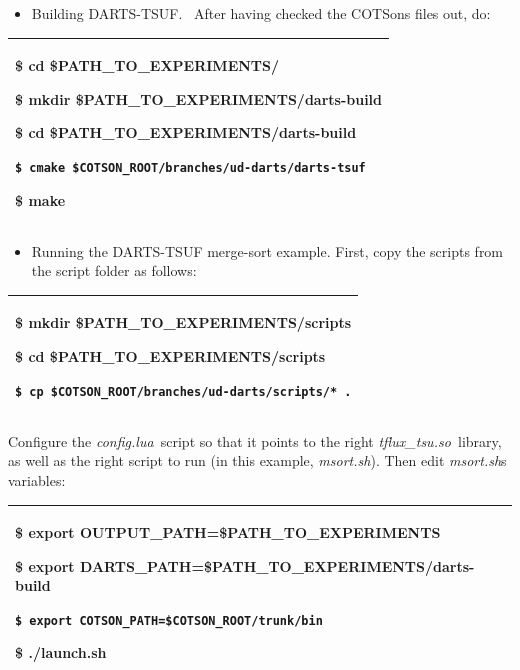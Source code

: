 \documentclass[a4paper]{article}
\begin{document}
\begin{itemize}
\item {
Building DARTS-TSUF. \ After having checked the
COTSon{\textquotesingle}s files out, do:}
\end{itemize}
\begin{flushleft}
\tablehead{}
\begin{supertabular}{|m{6.29346in}|}
\hline
{\ttfamily \$ cd \$PATH\_TO\_EXPERIMENTS/}

{\ttfamily \$ mkdir
\$PATH\_TO\_EXPERIMENTS/darts-build}

{\ttfamily \$ cd
\$PATH\_TO\_EXPERIMENTS/darts-build}

{ \texttt{\$ cmake
\$COTSON\_ROOT/branches/ud-darts/darts-tsuf}}

\ttfamily \$ make\\\hline
\end{supertabular}
\end{flushleft}
\begin{itemize}
\item {
Running the DARTS-TSUF merge-sort example. First, copy the scripts from
the script folder as follows:}
\end{itemize}
\begin{flushleft}
\tablehead{}
\begin{supertabular}{|m{6.29346in}|}
\hline
{\ttfamily \$ mkdir
\$PATH\_TO\_EXPERIMENTS/scripts}

{\ttfamily \$ cd
\$PATH\_TO\_EXPERIMENTS/scripts}

 \texttt{\$ cp
\$COTSON\_ROOT/branches/ud-darts/scripts/* .}\\\hline
\end{supertabular}
\end{flushleft}
{
Configure the \textit{config.lua}\texttt{ }script so that it points to
the right \textit{tflux\_tsu.so}\texttt{ }library, as well as the right
script to run (in this example, \textit{msort.sh}). Then edit
\textit{msort.sh}{\textquotesingle}s variables:}

\begin{flushleft}
\tablehead{}
\begin{supertabular}{|m{6.29346in}|}
\hline
{\ttfamily \$ export
OUTPUT\_PATH=\$PATH\_TO\_EXPERIMENTS}

{\ttfamily \$ export
DARTS\_PATH=\$PATH\_TO\_EXPERIMENTS/darts-build}

{ \texttt{\$ export
COTSON\_PATH=\$COTSON\_ROOT/trunk/bin}}

\ttfamily \$ ./launch.sh\\\hline
\end{supertabular}
\end{flushleft}
\end{document}
